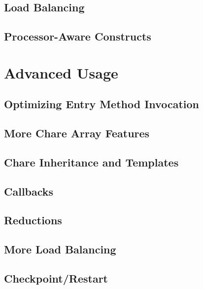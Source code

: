\documentclass[10pt]{report}
\begin{document}
\chapter{Load Balancing}
  

\chapter{Processor-Aware Constructs}
  
  


\part{Advanced Usage}

\chapter{Optimizing Entry Method Invocation}
  
  
  

\chapter{More Chare Array Features}
\label{advanced arrays}
  

\chapter{Chare Inheritance and Templates}
\label{inheritance and templates}
  

\chapter{Callbacks}
  
\chapter{Reductions}
  
  
  

\chapter{More Load Balancing}
  

\chapter{Checkpoint/Restart}
\label{sec:checkpoint}
  
\end{document}
